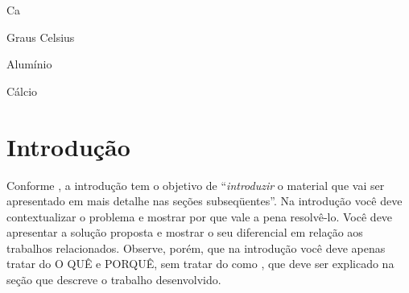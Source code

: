 \documentclass[twoside,english,brazilian]{UNISINOSmonografia}
\begin{document}
%
\begin{listadesimbolos}{Ca}
\item[\textsuperscript{o}C] Graus Celsius
\item[Al] Alumínio
\item[Ca] Cálcio
\end{listadesimbolos}

\tableofcontents

\chapter{Introdução}


Conforme , a introdução tem o objetivo de ``\emph{introduzir} o material que vai ser apresentado em mais detalhe nas seções subseqüentes''. Na introdução você deve contextualizar o problema e mostrar por que vale a pena resolvê-lo. Você deve apresentar a solução proposta e mostrar o seu diferencial em relação aos trabalhos relacionados. Observe, porém, que na introdução você deve apenas tratar do O QUÊ e PORQUÊ, sem tratar do como \cite{Hexsel11}, que deve ser explicado na seção que descreve o trabalho desenvolvido.
\end{document}
